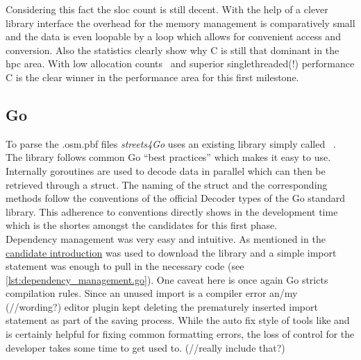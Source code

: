 Considering this fact the \gls{sloc} count is still decent. With the help of a clever library interface the overhead for the memory management is comparatively small and the data is even loopable by a  loop which allows for convenient access and conversion. Also the statistics clearly show why C is still that dominant in the \gls{hpc} area. With low allocation counts~ and superior singlethreaded(!) performance C is the clear winner in the performance area for this first milestone.

\subsection{Go}
\label{subsec:Implementation::Counting::Go}

To parse the .osm.pbf files \textit{streets4Go} uses an existing library simply called ~. The library follows common Go ``best practices'' which makes it easy to use. Internally goroutines are used to decode data in parallel which can then be retrieved through a  struct. The naming of the struct and the corresponding methods follow the conventions of the official Decoder types of the Go standard library. This adherence to conventions directly shows in the development time which is the shortes amongst the candidates for this first phase.
\\


Dependency management was very easy and intuitive. As mentioned in the \hyperref[subsec:State_of_the_art::Candidates::Go]{candidate introduction}  was used to download the library and a simple import statement was enough to pull in the necessary code (see \autoref{lst:dependency_management.go}). One caveat here is once again Go stricts compilation rules. Since an unused import is a compiler error an/my (//wording?) editor plugin kept deleting the prematurely inserted import statement as part of the saving process. While the auto fix style of tools like  and  is certainly helpful for fixing common formatting errors, the loss of control for the developer takes some time to get used to. (//really include that?)

